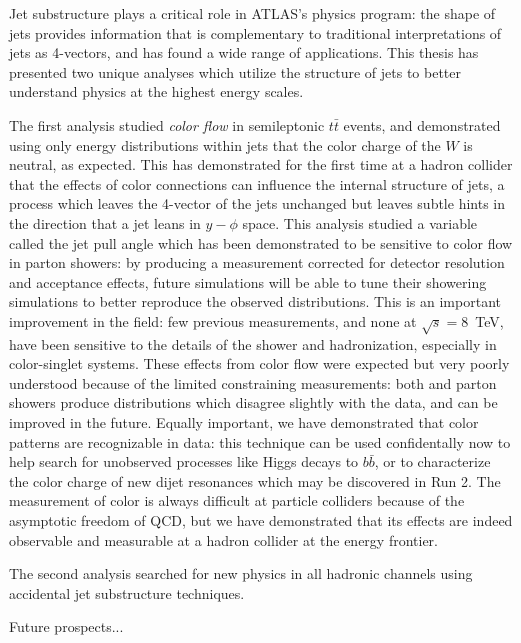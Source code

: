 \label{chapter:conclusion}

Jet substructure plays a critical role in ATLAS's physics program: the shape of jets provides information that is complementary to traditional interpretations of jets as 4-vectors, and has found a wide range of applications. This thesis has presented two unique analyses which utilize the structure of jets to better understand physics at the highest energy scales.

The first analysis studied \textit{color flow} in semileptonic $t\bar{t}$ events, and demonstrated using only energy distributions within jets that the color charge of the $W$ is neutral, as expected. This has demonstrated for the first time at a hadron collider that the effects of color connections can influence the internal structure of jets, a process which leaves the 4-vector of the jets unchanged but leaves subtle hints in the direction that a jet leans in $y-\phi$ space. This analysis studied a variable called the jet pull angle which has been demonstrated to be sensitive to color flow in parton showers: by producing a measurement corrected for detector resolution and acceptance effects, future simulations will be able to tune their showering simulations to better reproduce the observed distributions. This is an important improvement in the field: few previous measurements, and none at $\sqrt{s} = 8$~TeV, have been sensitive to the details of the shower and hadronization, especially in color-singlet systems. These effects from color flow were expected but very poorly understood because of the limited constraining measurements: both \Pythia and \Herwigpp parton showers produce distributions which disagree slightly with the data, and can be improved in the future. Equally important, we have demonstrated that color patterns are recognizable in data: this technique can be used confidentally now to help search for unobserved processes like Higgs decays to $b\bar{b}$, or to characterize the color charge of new dijet resonances which may be discovered in Run 2. The measurement of color is always difficult at particle colliders because of the asymptotic freedom of QCD, but we have demonstrated that its effects are indeed observable and measurable at a hadron collider at the energy frontier.

The second analysis searched for new physics in all hadronic channels using accidental jet substructure techniques.

Future prospects...

